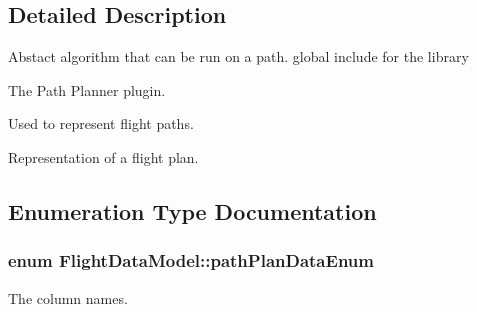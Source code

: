 \subsection{Detailed Description}
Abstact algorithm that can be run on a path. global include for the library

The Path Planner plugin.

Used to represent flight paths.

Representation of a flight plan.

\subsection{Enumeration Type Documentation}
\hypertarget{group___path_gaa0908516cbd02b164b605fce903d9066}{
\subsubsection[{path\-Plan\-Data\-Enum}]{\setlength{\rightskip}{0pt plus 5cm}enum {\bf Flight\-Data\-Model\-::path\-Plan\-Data\-Enum}}}\label{group___path_gaa0908516cbd02b164b605fce903d9066}


The column names. 


